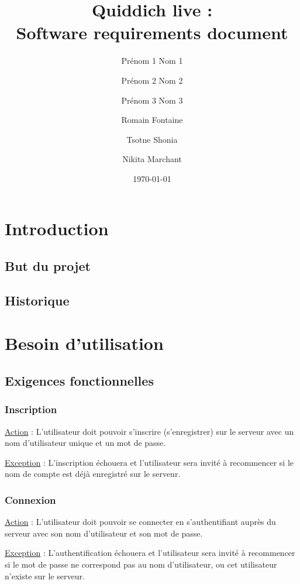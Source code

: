 \documentclass[a4paper]{article}
\title{Quiddich live : \\Software requirements document}
\author{Prénom 1 Nom 1 \and Prénom 2 Nom 2 \and Prénom 3 Nom 3 \and
Romain Fontaine \and Tsotne Shonia \and Nikita Marchant}
\date{\today}
\begin{document}
\maketitle

\section{Introduction}
\subsection{But du projet}

\printglossary[numberedsection]
\subsection{Historique}

\section{Besoin d'utilisation}
\subsection{Exigences fonctionnelles}
\subsubsection{Inscription}

\begin{description}[leftmargin=*] %
\item \underline{Action} : L'utilisateur doit pouvoir s'inscrire (s'enregistrer) sur le serveur avec un nom d'utilisateur unique et un mot de passe.
\item \underline{Exception} : L'inscription échouera et l'utilisateur sera invité à recommencer si le nom de compte est déjà enregistré sur le serveur.
\end{description} %

\subsubsection{Connexion}
\begin{description}[leftmargin=*] %
\item \underline{Action} : L'utilisateur doit pouvoir se connecter en s'authentifiant auprès du serveur avec son nom d'utilisateur et son mot de passe.
\item \underline{Exception} : L'authentification échouera et l'utilisateur sera invité à recommencer si le mot de passe ne correspond pas au nom d'utilisateur, ou cet utilisateur n'existe sur le serveur.
\end{description} %
\end{document}

